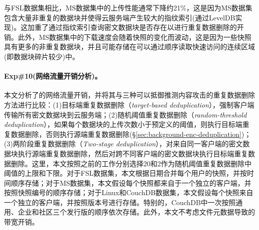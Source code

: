 与FSL数据集相比，MS数据集中的上传性能通常下降约21\%，这是因为MS数据集包含大量非重复的数据块并使得云服务端产生较大的指纹索引(通过LevelDB\cite{leveldb}实现)。这加重了通过指纹索引查询密文数据块是否存在以进行重复数据删除的开销。此外，MS数据集中的下载速度会随着快照的变化而波动，这是因为一些快照具有更多的非重复数据块，并且可能存储在可以通过顺序读取快速访问的连续区域(即数据块碎片较少\cite{lillibridge13})中。

\paragraph*{Exp\#10(网络流量开销分析)。}
本文分析了\prototype 的网络流量开销，并将其与三种可以抵御推测内容攻击的重复数据删除方法进行比较：(1)目标端重复数据删除（{\em target-based deduplication}）\cite{harnik2010side}，强制客户端传输所有密文数据块到云服务端；(2)随机阈值重复数据删除（{\em random-threshold deduplication}）\cite{harnik2010side}，如果每个数据块的上传次数小于预定义的阈值，则执行目标端重复数据删除，否则执行源端重复数据删除(\S\ref{sec:background-enc-deduplication})；(3)两阶段重复数据删除（{\em Two-stage deduplication}）\cite{li15}，对来自同一客户端的密文数据块执行源端重复数据删除，然后对跨不同客户端的密文数据块执行目标端重复数据删除。这里，本文按照之前的工作\cite{harnik2010side}分别选择20和2作为随机阈值重复数据删除中阈值的上限和下限。对于FSL数据集，本文根据日期合并每个用户的快照，并按时间顺序存储；对于MS数据集，本文假设每个快照都来自于一个独立的客户端，并按照快照编号的顺序存储；对于Linux和CouchDB数据集，本文假设每个快照来自一个独立的客户端，并按照版本号进行存储。特别的，CouchDB中一次按照通用、企业和社区三个发行版的顺序依次存储。此外，本文不考虑文件元数据导致的带宽开销。

